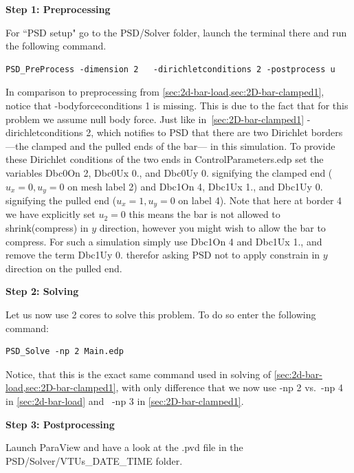 \textbf{Step 1: Preprocessing}

For ``PSD setup" go to the {\ttfamily PSD/Solver} folder, launch the terminal there and run the following command.
\begin{lstlisting}[style=Linux]
PSD_PreProcess -dimension 2   -dirichletconditions 2 -postprocess u
\end{lstlisting}
%
In comparison to preprocessing from \cref{sec:2d-bar-load,sec:2D-bar-clamped1}, notice that {\ttfamily -bodyforceconditions 1} is missing. This is due to the fact that for this problem we assume null body force. Just like in~\cref{sec:2D-bar-clamped1} {\ttfamily -dirichletconditions 2}, which notifies to PSD that there are two Dirichlet borders ---the clamped and the pulled ends of the bar--- in this simulation.
To provide these Dirichlet conditions of the two ends in {\ttfamily ControlParameters.edp} set the variables  {\ttfamily Dbc0On 2}, {\ttfamily Dbc0Ux 0.}, and {\ttfamily Dbc0Uy 0.} signifying the clamped end ($u_x=0,u_y=0$ on mesh label 2) and {\ttfamily Dbc1On 4}, {\ttfamily Dbc1Ux 1.}, and {\ttfamily Dbc1Uy 0.} signifying the pulled end ($u_x=1,u_y=0$  on label 4). Note that here at border 4 we have explicitly set $u_2=0$ this means the bar is not allowed to shrink(compress) in $y$ direction, however you might wish to allow the bar to compress. For such a simulation simply use {\ttfamily Dbc1On 4} and {\ttfamily Dbc1Ux 1.}, and remove the term {\ttfamily Dbc1Uy 0.} therefor asking PSD not to apply constrain in $y$ direction on the pulled end.

\textbf{Step 2: Solving}

Let us now use 2 cores to solve this problem. To do so enter the following command:

\begin{lstlisting}[style=Linux]
PSD_Solve -np 2 Main.edp
\end{lstlisting}
%
Notice, that this is the exact same command used in solving of \cref{sec:2d-bar-load,sec:2D-bar-clamped1}, with only difference that we now use {\ttfamily -np 2} vs.~{\ttfamily -np 4} in \cref{sec:2d-bar-load} and ~{\ttfamily -np 3} in \cref{sec:2D-bar-clamped1}.


\textbf{Step 3: Postprocessing}

Launch ParaView and have a look at the  {\ttfamily .pvd} file in the  {\ttfamily PSD/Solver/VTUs\_DATE\_TIME} folder. 

